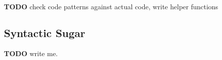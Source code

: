 \documentclass{article}
\begin{document}
\textbf{TODO} check code patterns against actual code, write helper functions

\subsection{Syntactic Sugar} \label{syntax-sec}

\textbf{TODO} write me.



\end{document}
